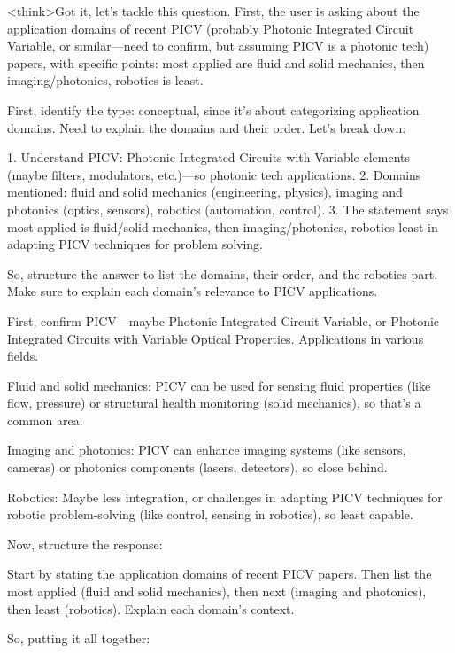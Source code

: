 <think>Got it, let's tackle this question. First, the user is asking about the application domains of recent PICV (probably Photonic Integrated Circuit Variable, or similar—need to confirm, but assuming PICV is a photonic tech) papers, with specific points: most applied are fluid and solid mechanics, then imaging/photonics, robotics is least. 

First, identify the type: conceptual, since it's about categorizing application domains. Need to explain the domains and their order. Let's break down:

1. Understand PICV: Photonic Integrated Circuits with Variable elements (maybe filters, modulators, etc.)—so photonic tech applications.
2. Domains mentioned: fluid and solid mechanics (engineering, physics), imaging and photonics (optics, sensors), robotics (automation, control).
3. The statement says most applied is fluid/solid mechanics, then imaging/photonics, robotics least in adapting PICV techniques for problem solving.

So, structure the answer to list the domains, their order, and the robotics part. Make sure to explain each domain's relevance to PICV applications.

First, confirm PICV—maybe Photonic Integrated Circuit Variable, or Photonic Integrated Circuits with Variable Optical Properties. Applications in various fields. 

Fluid and solid mechanics: PICV can be used for sensing fluid properties (like flow, pressure) or structural health monitoring (solid mechanics), so that's a common area. 

Imaging and photonics: PICV can enhance imaging systems (like sensors, cameras) or photonics components (lasers, detectors), so close behind. 

Robotics: Maybe less integration, or challenges in adapting PICV techniques for robotic problem-solving (like control, sensing in robotics), so least capable.

Now, structure the response:

Start by stating the application domains of recent PICV papers. Then list the most applied (fluid and solid mechanics), then next (imaging and photonics), then least (robotics). Explain each domain's context.

So, putting it all together:


